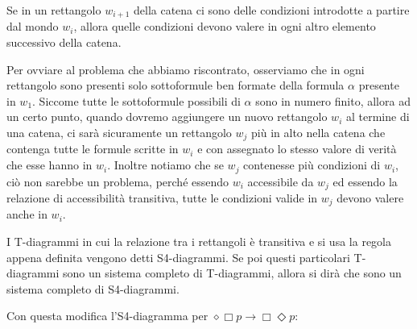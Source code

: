 \documentclass[a4paper, titlepage, 12pt]{report}
\begin{document}
Se in un rettangolo $w_{i+1}$ della catena ci sono delle condizioni introdotte
a partire dal mondo $w_i$, allora quelle condizioni devono valere
in ogni altro elemento successivo della catena.

Per ovviare al problema che abbiamo riscontrato, osserviamo che
in ogni rettangolo sono presenti solo
sottoformule ben formate della formula $\alpha$ presente in $w_1$.
Siccome tutte le sottoformule possibili di $\alpha$ sono in numero finito,
allora ad un certo punto, quando dovremo aggiungere un nuovo rettangolo $w_i$
al termine di una catena, ci sarà sicuramente un rettangolo $w_j$ più in alto nella catena
che contenga tutte le formule scritte in $w_i$ e con assegnato lo stesso
valore di verità che esse hanno in $w_i$.
Inoltre notiamo che se $w_j$ contenesse più condizioni di $w_i$,
ciò non sarebbe un problema, perché essendo $w_i$ accessibile da $w_j$ ed
essendo la relazione di accessibilità transitiva,
tutte le condizioni valide in $w_j$ devono valere anche in $w_i$.


I T-diagrammi in cui la relazione tra i rettangoli è transitiva e si usa la regola
appena definita vengono detti S4-diagrammi. Se poi questi particolari T-diagrammi
sono un sistema completo di T-diagrammi, allora si dirà che sono un sistema
completo di S4-diagrammi.

Con questa modifica l'S4-diagramma per $\diamond \Box p \rightarrow \Box \Diamond p$:
\end{document}
